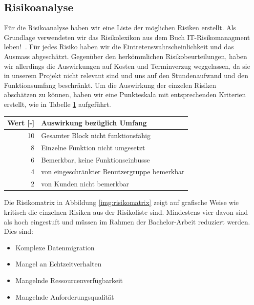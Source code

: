 \subsection{Risikoanalyse}
Für die Risikoanalyse haben wir eine Liste der möglichen  Risiken erstellt. Als Grundlage verwendeten wir das Risikolexikon aus dem Buch \flqq IT-Risikomanagment leben!\frqq ~\cite{AhrendtsFabian2008Il:w}. 
Für jedes Risiko haben wir die Eintretenswahrscheinlichkeit und das Ausmass abgeschätzt. Gegenüber den herkömmlichen Risikobeurteilungen, haben wir allerdings die Auswirkungen auf Kosten und Terminverzug weggelassen, da sie in unserem Projekt nicht relevant sind und uns auf den Stundenaufwand und den Funktionsumfang beschränkt. Um die Auswirkung der einzelen Risiken abschätzen zu können, haben wir eine Punkteskala mit entsprechenden Kriterien erstellt, wie in Tabelle \ref{tab:auswirkung} aufgeführt. \vspace{5mm} %

\begin{table}[h!]
\centering
\label{tab:auswirkung}
\begin{tabular}{rl}
Wert	[-]	& 	Auswirkung bezüglich Umfang \\
\hline
10	&	Gesamter Block nicht funktionsfähig \\
8	&	Einzelne Funktion nicht umgesetzt  \\
6	&	Bemerkbar, keine Funktionseinbusse \\
4	&	von eingeschränkter Benutzergruppe bemerkbar \\
2	&	von Kunden nicht bemerkbar
\end{tabular}
\end{table}

Die Risikomatrix in Abbildung \ref{img:risikomatrix} zeigt auf grafische Weise wie kritisch die einzelnen Risiken aus der Risikoliste sind. Mindestens vier davon sind als hoch eingestuft und müssen im Rahmen der Bachelor-Arbeit reduziert werden. Dies sind:

\begin{itemize}  
\item Komplexe Datenmigration
\item Mangel an Echtzeitverhalten
\item Mangelnde Ressourcenverfügbarkeit
\item Mangelnde Anforderungsqualität
\end{itemize}


